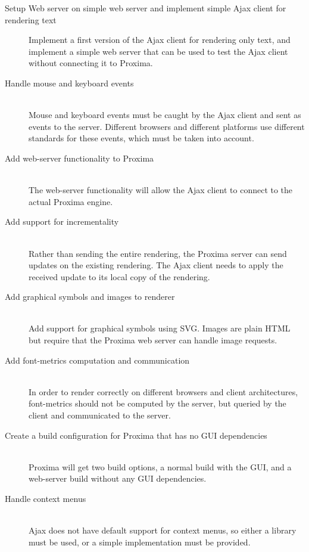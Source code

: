\documentclass[10pt]{article}
\begin{document}
\begin{description}
\item[Setup Web server on simple web server and implement simple Ajax client for rendering text]
Implement a first version of the Ajax client for rendering only text, and implement a simple web server that can be used to test the Ajax client without connecting it to Proxima.

\item[Handle mouse and keyboard events]~\\
Mouse and keyboard events must be caught by the Ajax client and sent as events to the server. Different browsers and different platforms use different standards for these events, which must be taken into account.

\item[Add web-server functionality to Proxima] ~\\
The web-server functionality will allow the Ajax client to connect to the actual Proxima engine.


\item[Add support for incrementality]~\\
Rather than sending the entire rendering, the Proxima server can send updates on the existing rendering. The Ajax client needs to apply the received update to its local copy of the rendering.

\item[Add graphical symbols and images to renderer]~\\
Add support for graphical symbols using SVG. Images are plain HTML but require that the Proxima web server can handle image requests.

\item[Add font-metrics computation and communication] ~\\
In order to render correctly on different browsers and client architectures, font-metrics should not be computed by the server, but queried by the client and communicated to the server.

\item[Create a build configuration for Proxima that has no GUI dependencies] ~\\
Proxima will get two build options, a normal build with the GUI, and a web-server build without any GUI dependencies. 

\item[Handle context menus]~\\
Ajax does not have default support for context menus, so either a library must be used, or a simple implementation must be provided.
\end{description}
\end{document}
